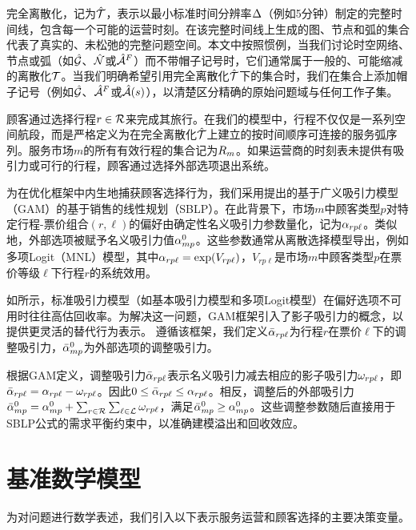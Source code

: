 完全离散化，记为$\hat{\mathcal{T}}$，表示以最小标准时间分辨率$\Delta$（例如5分钟）制定的完整时间线，包含每一个可能的运营时刻。在该完整时间线上生成的图、节点和弧的集合代表了真实的、未松弛的完整问题空间。本文中按照惯例，当我们讨论时空网络、节点或弧（如$\hat{\mathcal{G}}$、$\hat{\mathcal{N}}$或${\hat{\mathcal{A}}^F_{{}}}$）而不带帽子记号时，它们通常属于一般的、可能缩减的离散化$\mathcal{T}$。当我们明确希望引用完全离散化$\hat{\mathcal{T}}$下的集合时，我们在集合上添加帽子记号（例如$\full{\net}$、$\full{\flightArc}$或$\full{\segArcSet{s}}$），以清楚区分精确的原始问题域与任何工作子集。

顾客通过选择行程$r \in \mathcal{R}$来完成其旅行。在我们的模型中，行程不仅仅是一系列空间航段，而是严格定义为在完全离散化$\hat{\mathcal{T}}$上建立的按时间顺序可连接的服务弧序列。服务市场$m$的所有有效行程的集合记为$R_m$。如果运营商的时刻表未提供有吸引力或可行的行程，顾客通过选择外部选项退出系统。

为在优化框架中内生地捕获顾客选择行为，我们采用\citet{gallego2015general}提出的基于广义吸引力模型（GAM）的基于销售的线性规划（SBLP）。在此背景下，市场$m$中顾客类型$p$对特定行程-票价组合$(r, \ell)$的偏好由确定性名义吸引力参数量化，记为$\alpha_{rp\ell}$。类似地，外部选项被赋予名义吸引力值$\alpha^0_{mp}$。这些参数通常从离散选择模型导出，例如多项Logit（MNL）模型，其中$\alpha_{rp\ell} = \exp(V_{rp\ell})$，$V_{rp\ell}$是市场$m$中顾客类型$p$在票价等级$\ell$下行程$r$的系统效用。

如\citet{gallego2015general}所示，标准吸引力模型（如基本吸引力模型和多项Logit模型）在偏好选项不可用时往往高估回收率。为解决这一问题，GAM框架引入了影子吸引力的概念，以提供更灵活的替代行为表示。
遵循该框架，我们定义$\bar{\alpha}_{rp\ell}$为行程$r$在票价$\ell$下的调整吸引力，$\bar{\alpha}^0_{mp}$为外部选项的调整吸引力。

根据GAM定义，调整吸引力$\bar{\alpha}_{rp\ell}$表示名义吸引力减去相应的影子吸引力$\omega_{rp\ell}$，即$\bar{\alpha}_{rp\ell} = \alpha_{rp\ell} - \omega_{rp\ell}$。因此$0 \le \bar{\alpha}_{rp\ell} \le \alpha_{rp\ell}$。相反，调整后的外部吸引力$\bar{\alpha}^0_{mp} = \alpha^0_{mp} + \sum_{r\in \mathcal{R}}\sum_{\ell\in \mathcal{L}} \omega_{rp\ell}$，满足$\bar{\alpha}^0_{mp} \ge \alpha^0_{mp}$。这些调整参数随后直接用于SBLP公式的需求平衡约束中，以准确建模溢出和回收效应。

\section{基准数学模型}

为对问题进行数学表述，我们引入以下表示服务运营和顾客选择的主要决策变量。

